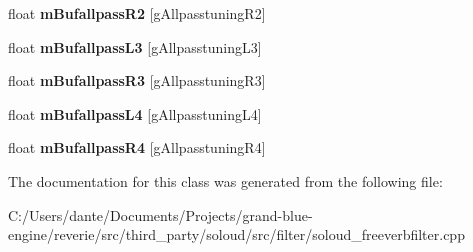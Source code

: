 \begin{DoxyCompactItemize}
float {\bfseries m\+Bufallpass\+R2} \mbox{[}g\+Allpasstuning\+R2\mbox{]}
\item 
\mbox{\label{class_so_loud_1_1_freeverb_impl_1_1_revmodel_ade1264b34e67ea9a0eed08bcf656f3e6}} 
float {\bfseries m\+Bufallpass\+L3} \mbox{[}g\+Allpasstuning\+L3\mbox{]}
\item 
\mbox{\label{class_so_loud_1_1_freeverb_impl_1_1_revmodel_a2dc263d4516a88377374fe4eda1522bc}} 
float {\bfseries m\+Bufallpass\+R3} \mbox{[}g\+Allpasstuning\+R3\mbox{]}
\item 
\mbox{\label{class_so_loud_1_1_freeverb_impl_1_1_revmodel_aadd3f823d8ceec0d1068fe069ea5ce1b}} 
float {\bfseries m\+Bufallpass\+L4} \mbox{[}g\+Allpasstuning\+L4\mbox{]}
\item 
\mbox{\label{class_so_loud_1_1_freeverb_impl_1_1_revmodel_a2f1bcf9811dff3b0f157623fa95e9afa}} 
float {\bfseries m\+Bufallpass\+R4} \mbox{[}g\+Allpasstuning\+R4\mbox{]}
\end{DoxyCompactItemize}


The documentation for this class was generated from the following file\+:\begin{DoxyCompactItemize}
\item 
C\+:/\+Users/dante/\+Documents/\+Projects/grand-\/blue-\/engine/reverie/src/third\+\_\+party/soloud/src/filter/soloud\+\_\+freeverbfilter.\+cpp\end{DoxyCompactItemize}
